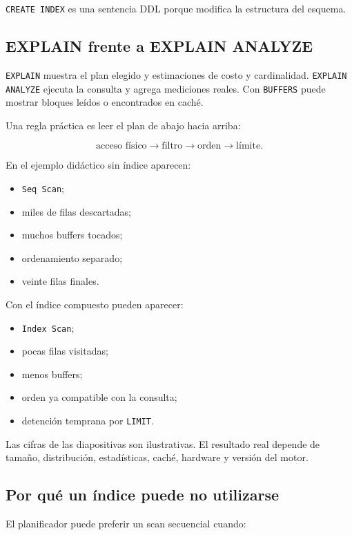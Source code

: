 \documentclass[variant=apuntes,cover=institutional,mode=screen]{ua-engineering-v6-article}
\begin{document}
\texttt{CREATE INDEX} es una sentencia DDL porque modifica la estructura del esquema.

\subsection{EXPLAIN frente a EXPLAIN ANALYZE}

\texttt{EXPLAIN} muestra el plan elegido y estimaciones de costo y cardinalidad. \texttt{EXPLAIN ANALYZE} ejecuta la consulta y agrega mediciones reales. Con \texttt{BUFFERS} puede mostrar bloques leídos o encontrados en caché.

Una regla práctica es leer el plan de abajo hacia arriba:

\[
\text{acceso físico} \rightarrow \text{filtro} \rightarrow \text{orden} \rightarrow \text{límite}.
\]

En el ejemplo didáctico sin índice aparecen:

\begin{itemize}
\item \texttt{Seq Scan};
\item miles de filas descartadas;
\item muchos buffers tocados;
\item ordenamiento separado;
\item veinte filas finales.
\end{itemize}

Con el índice compuesto pueden aparecer:

\begin{itemize}
\item \texttt{Index Scan};
\item pocas filas visitadas;
\item menos buffers;
\item orden ya compatible con la consulta;
\item detención temprana por \texttt{LIMIT}.
\end{itemize}

Las cifras de las diapositivas son ilustrativas. El resultado real depende de tamaño, distribución, estadísticas, caché, hardware y versión del motor.

\subsection{Por qué un índice puede no utilizarse}

El planificador puede preferir un scan secuencial cuando:
\end{document}
